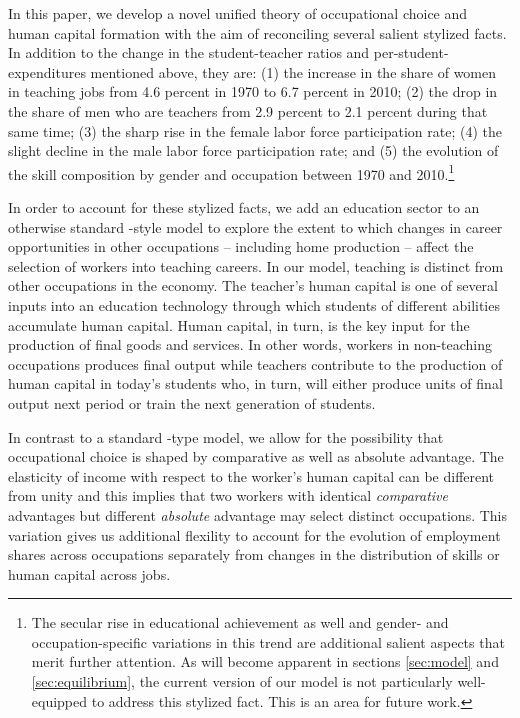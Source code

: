 \documentclass[onehalfspacing,11pt]{article}
\begin{document}
	In this paper, we develop a novel unified theory of occupational choice and human capital formation with the aim of reconciling several salient stylized facts. In addition to the change in the student-teacher ratios and per-student-expenditures mentioned above, they are: (1) the increase in the share of women in teaching jobs from 4.6 percent in 1970 to 6.7 percent in 2010; (2) the drop in the share of men who are teachers from 2.9 percent to 2.1 percent during that same time; (3) the sharp rise in the female labor force participation rate; (4) the slight decline in the male labor force participation rate; and (5) the evolution of the skill composition by gender and occupation between 1970 and 2010.\footnote{The secular rise in educational achievement as well and gender- and occupation-specific variations in this trend are additional salient aspects that merit further attention. As will become apparent in sections \ref{sec:model} and \ref{sec:equilibrium}, the current version of our model is not particularly well-equipped to address this stylized fact. This is an area for future work.}
	
	In order to account for these stylized facts, we add an education sector to an otherwise standard \cite{Hsieh:2019}-style model to explore the extent to which changes in career opportunities in other occupations -- including home production -- affect the selection of workers into teaching careers. In our model, teaching is distinct from other occupations in the economy. The teacher's human capital is one of several inputs into an education technology through which students of different abilities accumulate human capital. Human capital, in turn, is the key input for the production of final goods and services. In other words, workers in non-teaching occupations produces final output while teachers contribute to the production of human capital in today's students who, in turn, will either produce units of final output next period or train the next generation of students.%
	
	In contrast to a standard \cite{Roy:1951}-type model, we allow for the possibility that occupational choice is shaped by comparative as well as absolute advantage. The elasticity of income with respect to the worker's human capital can be different from unity and this implies that two workers with identical {\it comparative} advantages but different {\it absolute} advantage may select distinct occupations. This variation gives us additional flexility to account for the evolution of employment shares across occupations separately from changes in the distribution of skills or human capital across jobs.
	
\end{document}
